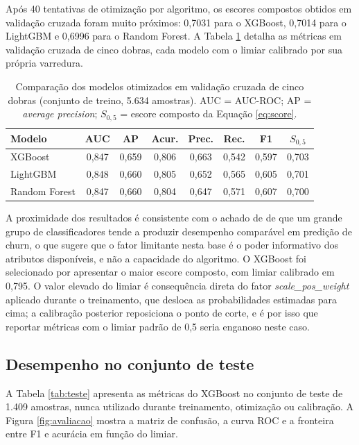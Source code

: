 \documentclass[12pt]{article}
\begin{document}
Após 40 tentativas de otimização por algoritmo, os escores compostos obtidos em
validação cruzada foram muito próximos: 0,7031 para o XGBoost, 0,7014 para o
LightGBM e 0,6996 para o Random Forest. A Tabela \ref{tab:modelos} detalha as
métricas em validação cruzada de cinco dobras, cada modelo com o limiar
calibrado por sua própria varredura.

\begin{table}[ht]
\centering
\caption{Comparação dos modelos otimizados em validação cruzada de cinco dobras (conjunto de treino, 5.634 amostras). AUC = AUC-ROC; AP = \textit{average precision}; $S_{0{,}5}$ = escore composto da Equação \ref{eq:score}.}
\label{tab:modelos}
\small
\begin{tabular}{|l|c|c|c|c|c|c|c|}
\hline
\textbf{Modelo} & \textbf{AUC} & \textbf{AP} & \textbf{Acur.} & \textbf{Prec.} & \textbf{Rec.} & \textbf{F1} & \textbf{$S_{0{,}5}$} \\
\hline
XGBoost      & 0,847 & 0,659 & 0,806 & 0,663 & 0,542 & 0,597 & 0,703 \\ \hline
LightGBM     & 0,848 & 0,660 & 0,805 & 0,652 & 0,565 & 0,605 & 0,701 \\ \hline
Random Forest & 0,847 & 0,660 & 0,804 & 0,647 & 0,571 & 0,607 & 0,700 \\
\hline
\end{tabular}
\end{table}

A proximidade dos resultados é consistente com o achado de \cite{verbeke2012}
de que um grande grupo de classificadores tende a produzir desempenho comparável
em predição de churn, o que sugere que o fator limitante nesta base é o poder
informativo dos atributos disponíveis, e não a capacidade do algoritmo. O
XGBoost foi selecionado por apresentar o maior escore composto, com limiar
calibrado em 0,795. O valor elevado do limiar é consequência direta do fator
\textit{scale\_pos\_weight} aplicado durante o treinamento, que desloca as
probabilidades estimadas para cima; a calibração posterior reposiciona o ponto
de corte, e é por isso que reportar métricas com o limiar padrão de 0,5 seria
enganoso neste caso.

\subsection{Desempenho no conjunto de teste}

A Tabela \ref{tab:teste} apresenta as métricas do XGBoost no conjunto de teste
de 1.409 amostras, nunca utilizado durante treinamento, otimização ou
calibração. A Figura \ref{fig:avaliacao} mostra a matriz de confusão, a curva
ROC e a fronteira entre F1 e acurácia em função do limiar.
\end{document}
